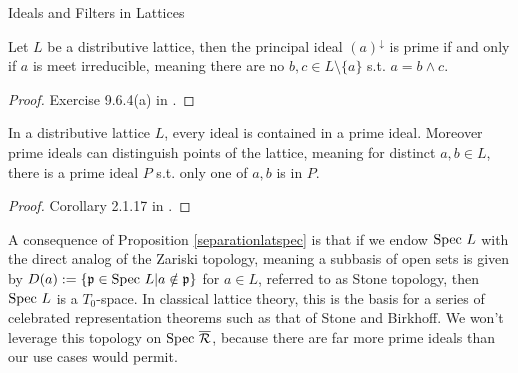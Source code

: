 \begin{subsection}{Ideals and Filters in Lattices}
    \begin{proposition} \label{meetirreducibleprime}
        Let \( L \) be a distributive lattice, then the principal ideal \( (a)^\downarrow  \)
        is prime if and only if \( a \) is meet irreducible,
        meaning there are no \( b, c \in L \setminus \{a\} \) s.t. \( a = b \wedge c \).
    \end{proposition}
    \begin{proof}
        Exercise 9.6.4(a) in \cite{birkhoff1948lattice}.
    \end{proof}
    \begin{proposition} \label{separationlatspec}
        In a distributive lattice \( L \), every ideal is contained in a prime ideal.
        Moreover prime ideals can distinguish points of the lattice, meaning for distinct \( a, b \in L \),
        there is a prime ideal \( P \) s.t. only one of \( a,b \) is in \( P \).
    \end{proposition}
    \begin{proof}
        Corollary 2.1.17 in \cite{genlattheorygraetzer}.
    \end{proof}
    \begin{remark}
        A consequence of Proposition \ref{separationlatspec} is that if we endow 
        \( \text{Spec } L \) with the direct analog of the Zariski topology,
        meaning a subbasis of open sets is given by \( D(a) := \{ \mathfrak{p} \in \text{Spec } L | a \notin \mathfrak{p} \} \)
        for \( a \in L \), referred to as Stone topology, then \( \text{Spec } L \) is a \( T_0 \)-space.
        In classical lattice theory, this is the basis for a series of celebrated representation theorems
        such as that of Stone and Birkhoff. We won't leverage this topology on \( \text{Spec } \overline{\mathcal{R}} \), because
        there are far more prime ideals than our use cases would permit.
    \end{remark}
\end{subsection}

